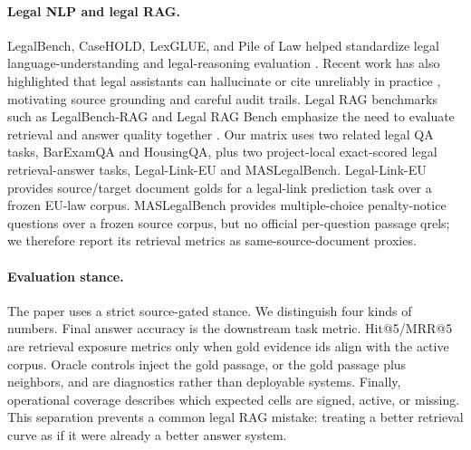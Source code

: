 \paragraph{Legal NLP and legal RAG.}
LegalBench, CaseHOLD, LexGLUE, and Pile of Law helped standardize legal
language-understanding and legal-reasoning evaluation
\citep{guha2023legalbench,zheng2021casehold,chalkidis2022lexglue,henderson2022pileoflaw}.
Recent work has also highlighted that legal assistants can hallucinate or cite
unreliably in practice \citep{magesh2024hallucinations}, motivating source
grounding and careful audit trails. Legal RAG benchmarks such as LegalBench-RAG
and Legal RAG Bench emphasize the need to evaluate retrieval and answer quality
together \citep{pipitone2024legalbenchrag,butler2026legalragbench}. Our matrix
uses two related legal QA tasks, BarExamQA and HousingQA, plus two project-local
exact-scored legal retrieval-answer tasks, Legal-Link-EU and MASLegalBench.
Legal-Link-EU provides source/target document golds for a legal-link prediction
task over a frozen EU-law corpus. MASLegalBench provides multiple-choice
penalty-notice questions over a frozen source corpus, but no official
per-question passage qrels; we therefore report its retrieval metrics as
same-source-document proxies.

\paragraph{Evaluation stance.}
The paper uses a strict source-gated stance. We distinguish four kinds of
numbers. Final answer accuracy is the downstream task metric. Hit@5/MRR@5 are
retrieval exposure metrics only when gold evidence ids align with the active
corpus. Oracle controls inject the gold passage, or the gold passage plus
neighbors, and are diagnostics rather than deployable systems. Finally,
operational coverage describes which expected cells are signed, active, or
missing. This separation prevents a common legal RAG mistake: treating a better
retrieval curve as if it were already a better answer system.
